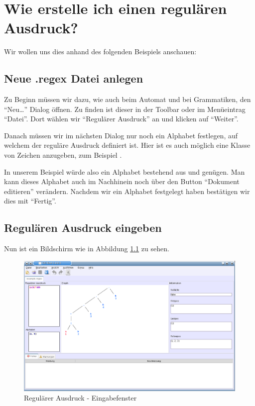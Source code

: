 \chapter{Wie erstelle ich einen regulären Ausdruck?}

Wir wollen uns dies anhand des folgenden Beispiels anschauen: 

\section{Neue .regex Datei anlegen}

Zu Beginn müssen wir dazu, wie auch beim Automat und bei Grammatiken, den "`Neu\ldots"' Dialog öffnen. Zu finden ist dieser in der Toolbar oder im Menüeintrag "`Datei"'. Dort wählen wir "`Regulärer Ausdruck"' an und klicken auf "`Weiter"'.\vspace{10pt}

Danach müssen wir im nächsten Dialog nur noch ein Alphabet festlegen, auf welchem der reguläre Ausdruck definiert ist. Hier ist es auch möglich eine Klasse von Zeichen anzugeben, zum Beispiel \Symbol{[a-z]}.\vspace{10pt}

In unserem Beispiel würde also ein Alphabet bestehend aus  und  genügen. Man kann dieses Alphabet auch im Nachhinein noch über den Button "`Dokument editieren"' verändern. Nachdem wir ein Alphabet festgelegt haben bestätigen wir dies mit "`Fertig"'.\vspace{10pt}

\section{Regulären Ausdruck eingeben}

Nun ist ein Bildschirm wie in Abbildung \ref{regex} zu sehen.

\begin{figure}[h]
\begin{center}
\includegraphics[width=12cm]{../images/regex_example.png}
\caption{Regulärer Ausdruck - Eingabefenster}
\label{regex}
\end{center}
\end{figure}

